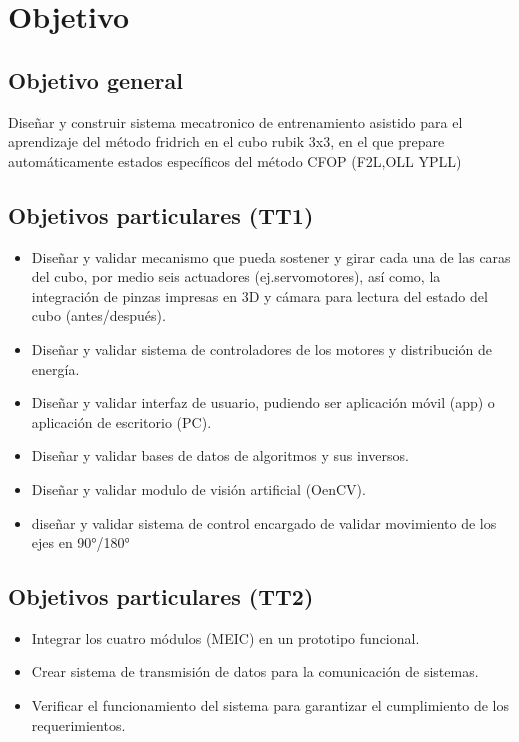 \section{Objetivo}


\subsection{Objetivo general}
\label{Objetivo general}

Diseñar y construir sistema mecatronico de entrenamiento asistido para el aprendizaje del método fridrich en el cubo rubik 3x3, en el que prepare automáticamente estados específicos del método CFOP (F2L,OLL YPLL) 

\subsection{Objetivos particulares (TT1)}
\begin{itemize}
    \item Diseñar y validar mecanismo que pueda sostener y girar cada una de las caras del cubo, por medio seis actuadores (ej.servomotores), así como, la integración de pinzas impresas en 3D y cámara para lectura del estado del cubo (antes/después).
    \item Diseñar y validar sistema de controladores de los motores y distribución de energía.  
    \item Diseñar y validar interfaz de usuario, pudiendo ser aplicación móvil (app) o aplicación de escritorio (PC).
    \item Diseñar y validar bases de datos de algoritmos y sus inversos.
    \item Diseñar y validar modulo de visión artificial (OenCV).
    \item diseñar y validar sistema de control encargado de validar movimiento de los ejes en 90°/180°
\end{itemize}

\subsection{Objetivos particulares (TT2)}
\begin{itemize}
    \item Integrar los cuatro módulos (MEIC) en un prototipo funcional.
    \item Crear sistema de transmisión de datos para la comunicación de sistemas.  
    \item Verificar el funcionamiento del sistema para garantizar el cumplimiento de los requerimientos.
\end{itemize}
    